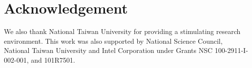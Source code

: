 \section{Acknowledgement} \label{sec:ack}

We also thank National Taiwan University for providing a stimulating research environment.
This work was also supported by National Science Council, National Taiwan University and Intel Corporation under Grants NSC 100-2911-I-002-001, and 101R7501.
